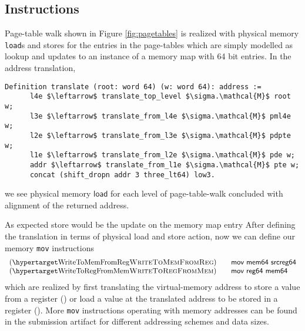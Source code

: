 \subsection{Instructions}
\label{sec:instructions}
Page-table walk shown in Figure \ref{fig:pagetables} is realized with physical memory \texttt{load}s and \textsf{store}s for the entries in the page-tables which are simply modelled as lookup and updates to an instance of a memory map with 64 bit entries. In the address translation,
\begin{lstlisting}[language=Coq]
 Definition translate (root: word 64) (w: word 64): address :=
      l4e $\leftarrow$ translate_top_level $\sigma.\mathcal{M}$ root w; 
      l3e $\leftarrow$ translate_from_l4e $\sigma.\mathcal{M}$ pml4e w; 
      l2e $\leftarrow$ translate_from_l3e $\sigma.\mathcal{M}$ pdpte w;
      l1e $\leftarrow$ translate_from_l2e $\sigma.\mathcal{M}$ pde w;
      addr $\leftarrow$ translate_from_l1e $\sigma.\mathcal{M}$ pte w;
      concat (shift_dropn addr 3 three_lt64) low3.
\end{lstlisting}
we see physical memory $\mathsf{load}$ for each level of page-table-walk concluded with alignment of the returned address.

As expected \textsf{store} would be the update on the memory map entry
After defining the translation in terms of physical load and store action, now we can define our memory \lstinline|mov| instructions
\[
\begin{array}{l}
  \hbox{(\TirNameStyle{WriteToMemFromReg})} \qquad
  \textsf{mov mem64 srcreg64} \\
  \hbox{(\TirNameStyle{WriteToRegFromMem})} \qquad 
  \textsf{mov reg64 mem64}
  \end{array}
  \]
  which are realized by first translating the virtual-memory address to store a value from a register () or load a value at the translated address to be stored in a register (). More \lstinline|mov| instructions operating with memory addresses can be found in the submission artifact for different addressing schemes and data sizes.

